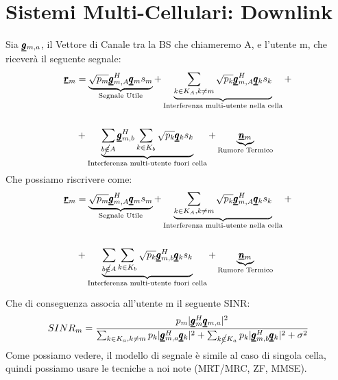 \section{Sistemi Multi-Cellulari: Downlink}
Sia $\pmb{\underline{g}}_{m,a}$, il Vettore di Canale tra la BS che chiameremo A, e l'utente m, che riceverà il seguente segnale:
\begin{equation*}
    \begin{aligned}
    \pmb{\underline{r}}_m &= \underbrace{\sqrt{p_m} \pmb{\underline{g}}_{m,A}^H\pmb{\underline{q}}_m s_m}_{\text{Segnale Utile}} + \underbrace{\sum_{k \in K_A, k \neq m} \sqrt{p_k} \pmb{\underline{g}}_{m,A}^H \pmb{\underline{q}}_k s_k}_{\text{Interferenza multi-utente nella cella}} +\\ \\
    &+ \underbrace{\sum_{b \cancel{\in} A} \pmb{\underline{g}}_{m,b}^H \sum_{k \in K_b} \sqrt{p_k} \pmb{\underline{q}}_k s_k}_{\text{Interferenza multi-utente fuori cella}} + \underbrace{\pmb{\underline{n}}_m}_{\text{Rumore Termico}}
     \end{aligned}
\end{equation*}
Che possiamo riscrivere come:
\begin{equation*}
    \begin{aligned}
    \pmb{\underline{r}}_m &= \underbrace{\sqrt{p_m} \pmb{\underline{g}}_{m,A}^H\pmb{\underline{q}}_m s_m}_{\text{Segnale Utile}} + \underbrace{\sum_{k \in K_A, k \neq m} \sqrt{p_k} \pmb{\underline{g}}_{m,A}^H\pmb{\underline{q}}_k s_k}_{\text{Interferenza multi-utente nella cella}} +\\ \\
    &+ \underbrace{\sum_{b \cancel{\in} A} \sum_{k \in K_b}   \sqrt{p_k} \pmb{\underline{g}}_{m,b}^H \pmb{\underline{q}}_k s_k}_{\text{Interferenza multi-utente fuori cella}} + \underbrace{\pmb{\underline{n}}_m}_{\text{Rumore Termico}}
     \end{aligned}
\end{equation*}

Che di conseguenza associa all'utente m il seguente SINR:
\begin{equation*}
    SINR_m = \frac{p_m |\pmb{\underline{g}}_m^H\pmb{\underline{q}}_{m,a}|^2}{\sum_{k \in K_a, k \neq m} p_k |\pmb{\underline{g}}_{m,a}^H\pmb{\underline{q}}_{k}|^2 + \sum_{k \cancel{\in} K_a}  p_k |\pmb{\underline{g}}_{m,b}^H\pmb{\underline{q}}_{k}|^2 + \sigma^2 } 
\end{equation*}
Come possiamo vedere, il modello di segnale è simile al caso di singola cella, quindi possiamo usare le tecniche a noi note (MRT/MRC, ZF, MMSE).